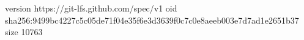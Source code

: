 version https://git-lfs.github.com/spec/v1
oid sha256:9499bc4227c5c05de71f04e35f6e3d3639f0c7c0e8aeeb003e7d7ad1e2651b37
size 10763
